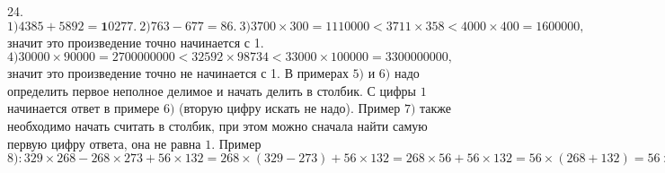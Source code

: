 24. $1)4385+5892=\textbf{1}0277.\ 2) 763-677=86.\ 3)3700\times300=1110000<3711\times358<4000\times400=1600000,$ значит это произведение точно начинается с 1.
$4)30000\times90000=2700000000<32592\times98734<33000\times100000=3300000000,$ значит это произведение точно не начинается с 1.
В примерах $5)$ и $6)$ надо определить первое неполное делимое и начать делить в столбик. С цифры $1$ начинается ответ в примере $6)$ (вторую цифру искать не надо). Пример $7)$ также необходимо начать считать в столбик, при этом можно сначала найти самую первую цифру ответа, она не равна $1.$ Пример $8):
329\times268-268\times273+56\times132=268\times(329-273)+56\times132=268\times56+56\times132=56\times(268+132)=56\times400=22400.$\\
